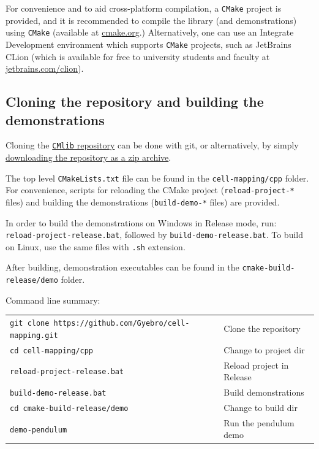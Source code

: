 \documentclass[11pt]{article}
\begin{document}
For convenience and to aid cross-platform compilation, a \texttt{CMake} project is provided, and it is recommended to compile the library (and demonstrations) using \texttt{CMake} (available at \href{https://cmake.org/}{cmake.org}.) 
Alternatively, one can use an Integrate Development environment which supports \texttt{CMake} projects, such as JetBrains CLion (which is available for free to university students and faculty at \href{https://www.jetbrains.com/clion/}{jetbrains.com/clion}).

\subsection{Cloning the repository and building the demonstrations}

Cloning the \href{https://github.com/Gyebro/cell-mapping.git}{\texttt{CMlib} repository} can be done with git, or alternatively, by simply  \href{https://github.com/Gyebro/cell-mapping/archive/master.zip}{downloading the repository as a zip archive}.

The top level \texttt{CMakeLists.txt} file can be found in the \texttt{cell-mapping/cpp} folder. For convenience, scripts for reloading the CMake project (\texttt{reload-project-*} files) and building the demonstrations (\texttt{build-demo-*} files) are provided.

In order to build the demonstrations on Windows in Release mode, run:\\
\texttt{reload-project-release.bat}, followed by \texttt{build-demo-release.bat}. 
To build on Linux, use the same files with \texttt{.sh} extension.

After building, demonstration executables can be found in the \texttt{cmake-build-release/demo} folder.

Command line summary:\\
\begin{tabular}{l|l}
		\texttt{git clone https://github.com/Gyebro/cell-mapping.git} & Clone the repository \\
		\texttt{cd cell-mapping/cpp} & Change to project dir \\
		\texttt{reload-project-release.bat} & Reload project in Release\\
		\texttt{build-demo-release.bat} & Build demonstrations\\
		\texttt{cd cmake-build-release/demo} & Change to build dir\\
		\texttt{demo-pendulum} & Run the pendulum demo
\end{tabular}
\end{document}
